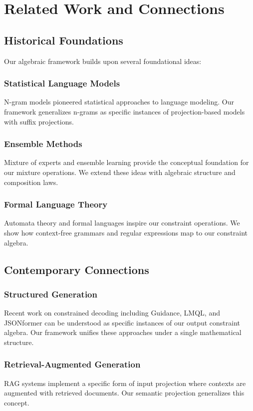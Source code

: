 \documentclass{article}
\theoremstyle{definition}
\begin{document}
\section{Related Work and Connections}

\subsection{Historical Foundations}

Our algebraic framework builds upon several foundational ideas:

\subsubsection{Statistical Language Models}
N-gram models \cite{placeholder} pioneered statistical approaches to language modeling. Our framework generalizes n-grams as specific instances of projection-based models with suffix projections.

\subsubsection{Ensemble Methods}
Mixture of experts \cite{placeholder} and ensemble learning provide the conceptual foundation for our mixture operations. We extend these ideas with algebraic structure and composition laws.

\subsubsection{Formal Language Theory}
Automata theory and formal languages \cite{placeholder} inspire our constraint operations. We show how context-free grammars and regular expressions map to our constraint algebra.

\subsection{Contemporary Connections}

\subsubsection{Structured Generation}
Recent work on constrained decoding \cite{placeholder} including Guidance, LMQL, and JSONformer can be understood as specific instances of our output constraint algebra. Our framework unifies these approaches under a single mathematical structure.

\subsubsection{Retrieval-Augmented Generation}
RAG systems \cite{placeholder} implement a specific form of input projection where contexts are augmented with retrieved documents. Our semantic projection generalizes this concept.
\end{document}

